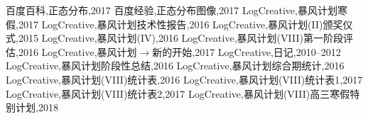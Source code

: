 \documentclass[a4paper,12pt]{article}
\begin{document}
\begin{CJK}{UTF8}{song}
\begin{thebibliography}{}
    \bibitem[1]{}
    百度百科,正态分布,2017
    \bibitem[2]{}
    百度经验,正态分布图像,2017
    \bibitem[3]{}
    LogCreative,暴风计划寒假,2017
    \bibitem[4]{}
    LogCreative,暴风计划技术性报告,2016
    \bibitem[5]{}
    LogCreative,暴风计划(II)颁奖仪式,2015
    \bibitem[6]{}
    LogCreative,暴风计划(IV),2016
    \bibitem[7]{}
    LogCreative,暴风计划(VIII)第一阶段评估,2016
    \bibitem[8]{}
    LogCreative,暴风计划$\rightarrow$新的开始,2017
    \bibitem[9]{}
    LogCreative,日记,2010--2012
    \bibitem[10]{}
    LogCreative,暴风计划阶段性总结,2016
    \bibitem[11]{}
    LogCreative,暴风计划综合期统计,2016
    \bibitem[12]{}
    LogCreative,暴风计划(VIII)统计表,2016
    \bibitem[13]{}
    LogCreative,暴风计划(VIII)统计表1,2017
    \bibitem[14]{}
    LogCreative,暴风计划(VIII)统计表2,2017
    \bibitem[15]{}
    LogCreative,暴风计划(VIII)高三寒假特别计划,2018
\end{thebibliography}
    

\end{CJK}
\end{document}
